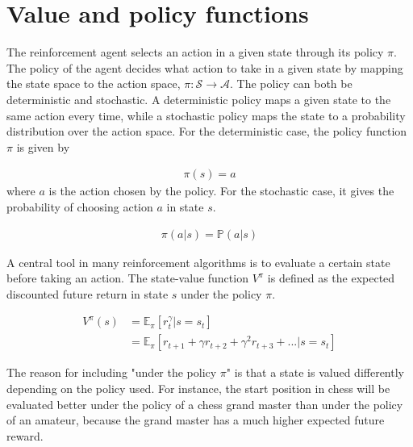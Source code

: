 \documentclass[class=book, crop=false]{standalone}
\begin{document}
\section{Value and policy functions}
The reinforcement agent selects an action in a given state through its policy $\pi$. The policy of the agent decides what action to take in a given state by mapping the state space to the action space, $\pi: \mathcal{S} \to \mathcal{A}$. The policy can both be deterministic and stochastic. A deterministic policy maps a given state to the same action every time, while a stochastic policy maps the state to a probability distribution over the action space. For the deterministic case, the policy function $\pi$ is given by


\begin{equation}
   \begin{aligned}\label{eq:theory:policy_function_deterministic}
\pi(s) = a
\end{aligned} 
\end{equation}
where $a$ is the action chosen by the policy. For the stochastic case, it gives the probability of choosing action $a$ in state $s$.


\begin{equation}
   \begin{aligned}\label{eq:theory:policy_function_stochastic}
\pi(a|s) = \mathbb{P}(a|s)
\end{aligned} 
\end{equation}


A central tool in many reinforcement algorithms is to evaluate a certain state before taking an action. The state-value function $V^{\pi}$ is defined as the expected discounted future return in state $s$ under the policy $\pi$.

\begin{equation}
   \begin{aligned}\label{eq:theory:value_function}
V^{\pi}(s) 
&= \mathbb{E}_{\pi}[r^{\gamma}_{t}| s=s_{t}]
\\
&= \mathbb{E}_{\pi}[ r_{t+1} + \gamma r_{t+2} + \gamma^{2} r_{t+3} + ...|s=s_{t}]
\end{aligned} 
\end{equation}

The reason for including "under the policy $\pi$" is that a state is valued differently depending on the policy used. For instance, the start position in chess will be evaluated better under the policy of a chess grand master than under the policy of an amateur, because the grand master has a much higher expected future reward. 
\end{document}
